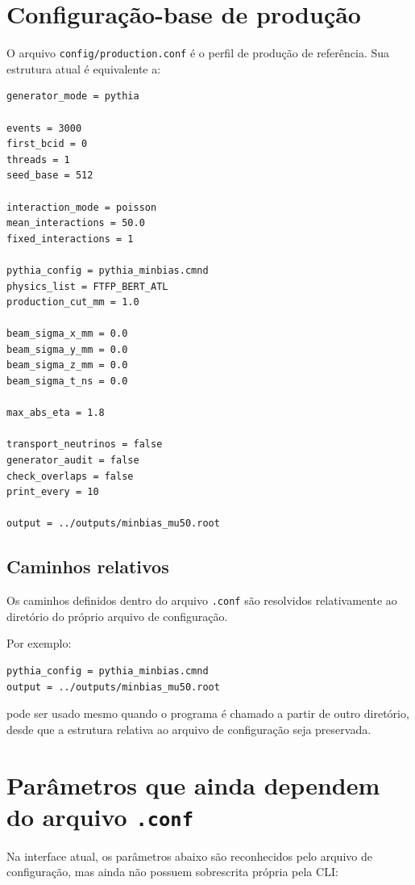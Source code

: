 \documentclass[11pt,a4paper]{article}
\begin{document}
\section{Configuração-base de produção}

O arquivo \texttt{config/production.conf} é o perfil de produção de referência.
Sua estrutura atual é equivalente a:

\begin{lstlisting}[style=config]
generator_mode = pythia

events = 3000
first_bcid = 0
threads = 1
seed_base = 512

interaction_mode = poisson
mean_interactions = 50.0
fixed_interactions = 1

pythia_config = pythia_minbias.cmnd
physics_list = FTFP_BERT_ATL
production_cut_mm = 1.0

beam_sigma_x_mm = 0.0
beam_sigma_y_mm = 0.0
beam_sigma_z_mm = 0.0
beam_sigma_t_ns = 0.0

max_abs_eta = 1.8

transport_neutrinos = false
generator_audit = false
check_overlaps = false
print_every = 10

output = ../outputs/minbias_mu50.root
\end{lstlisting}

\subsection{Caminhos relativos}

Os caminhos definidos dentro do arquivo \texttt{.conf} são resolvidos
relativamente ao diretório do próprio arquivo de configuração.

Por exemplo:

\begin{lstlisting}[style=config]
pythia_config = pythia_minbias.cmnd
output = ../outputs/minbias_mu50.root
\end{lstlisting}

pode ser usado mesmo quando o programa é chamado a partir de outro diretório,
desde que a estrutura relativa ao arquivo de configuração seja preservada.

\section{Parâmetros que ainda dependem do arquivo \texttt{.conf}}

Na interface atual, os parâmetros abaixo são reconhecidos pelo arquivo de
configuração, mas ainda não possuem sobrescrita própria pela CLI:
\end{document}
